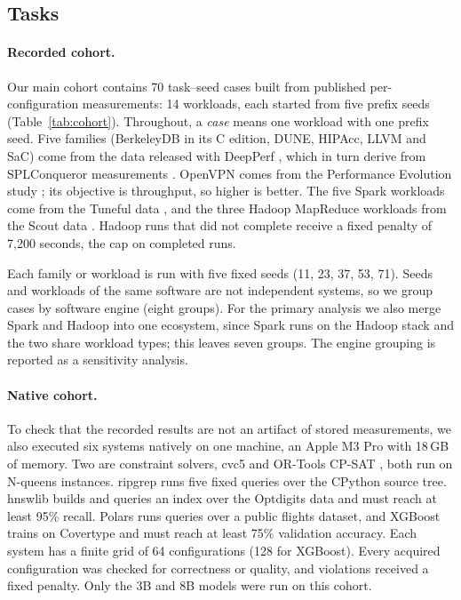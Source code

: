 \subsection{Tasks}

\paragraph{Recorded cohort.} Our main cohort contains 70 task--seed cases built from published per-configuration measurements: 14 workloads, each started from five prefix seeds (Table~\ref{tab:cohort}). Throughout, a \emph{case} means one workload with one prefix seed. Five families (BerkeleyDB in its C edition, DUNE, HIPAcc, LLVM and SaC) come from the data released with DeepPerf \cite{ha2019deepperf}, which in turn derive from SPLConqueror measurements \cite{siegmund2015influence}. OpenVPN comes from the Performance Evolution study \cite{kaltenecker2023evolution}; its objective is throughput, so higher is better. The five Spark workloads come from the Tuneful data \cite{fekry2020tuneful}, and the three Hadoop MapReduce workloads from the Scout data \cite{hsu2018scout}. Hadoop runs that did not complete receive a fixed penalty of 7,200 seconds, the cap on completed runs.

Each family or workload is run with five fixed seeds (11, 23, 37, 53, 71). Seeds and workloads of the same software are not independent systems, so we group cases by software engine (eight groups). For the primary analysis we also merge Spark and Hadoop into one ecosystem, since Spark runs on the Hadoop stack and the two share workload types; this leaves seven groups. The engine grouping is reported as a sensitivity analysis.

\paragraph{Native cohort.} To check that the recorded results are not an artifact of stored measurements, we also executed six systems natively on one machine, an Apple M3 Pro with 18\,GB of memory. Two are constraint solvers, cvc5 \cite{barbosa2022cvc5} and OR-Tools CP-SAT \cite{perron2023ortools}, both run on N-queens instances. ripgrep \cite{gallant2016ripgrep} runs five fixed queries over the CPython source tree. hnswlib \cite{malkov2020hnsw} builds and queries an index over the Optdigits data and must reach at least 95\% recall. Polars \cite{vink2020polars} runs queries over a public flights dataset, and XGBoost \cite{chen2016xgboost} trains on Covertype and must reach at least 75\% validation accuracy. Each system has a finite grid of 64 configurations (128 for XGBoost). Every acquired configuration was checked for correctness or quality, and violations received a fixed penalty. Only the 3B and 8B models were run on this cohort.


